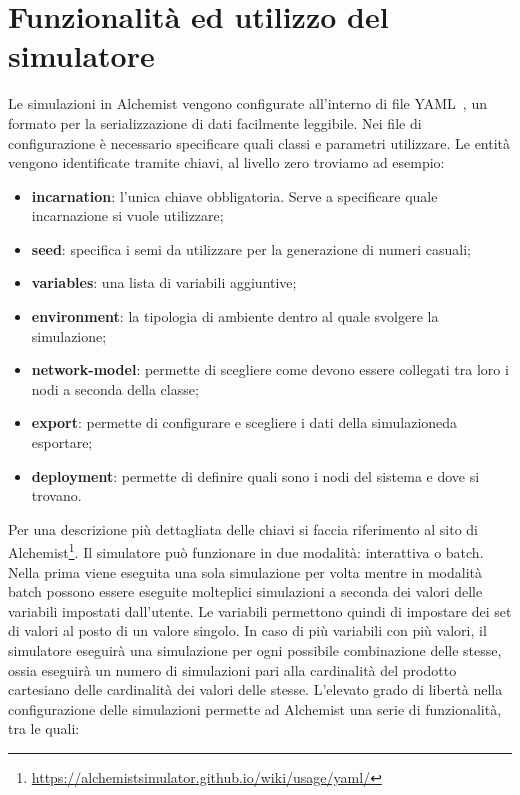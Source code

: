 \documentclass[12pt,a4paper,openright,oneside]{book}
\begin{document}
\section{Funzionalità ed utilizzo del simulatore}
Le simulazioni in Alchemist vengono configurate all'interno di file YAML~\cite{YAML2009}, un formato per la serializzazione di dati facilmente leggibile.
Nei file di configurazione è necessario specificare quali classi e parametri utilizzare.
Le entità vengono identificate tramite chiavi, al livello zero troviamo ad esempio:
\begin{itemize}
    \item \textbf{incarnation}: l'unica chiave obbligatoria. Serve a specificare quale incarnazione si vuole utilizzare;
    \item \textbf{seed}: specifica i semi da utilizzare per la generazione di numeri casuali;
    \item \textbf{variables}: una lista di variabili aggiuntive;
    \item \textbf{environment}: la tipologia di ambiente dentro al quale svolgere la simulazione;
    \item \textbf{network-model}: permette di scegliere come devono essere collegati tra loro i nodi a seconda della classe;
    \item \textbf{export}: permette di configurare e scegliere i dati della simulazioneda esportare;
    \item \textbf{deployment}: permette di definire quali sono i nodi del sistema e dove si trovano.
\end{itemize}
Per una descrizione più dettagliata delle chiavi si faccia riferimento al sito di Alchemist\footnote{\url{https://alchemistsimulator.github.io/wiki/usage/yaml/}}.
Il simulatore può funzionare in due modalità: interattiva o batch.
Nella prima viene eseguita una sola simulazione per volta mentre in modalità batch possono essere eseguite molteplici simulazioni a seconda dei valori delle variabili impostati dall'utente.
Le variabili permettono quindi di impostare dei set di valori al posto di un valore singolo. In caso di più variabili con più valori, il simulatore
eseguirà una simulazione per ogni possibile combinazione delle stesse, ossia eseguirà un numero di simulazioni pari alla cardinalità del prodotto cartesiano delle cardinalità dei valori delle stesse.
L'elevato grado di libertà nella configurazione delle simulazioni permette ad Alchemist una serie di funzionalità, tra le quali:
\end{document}
